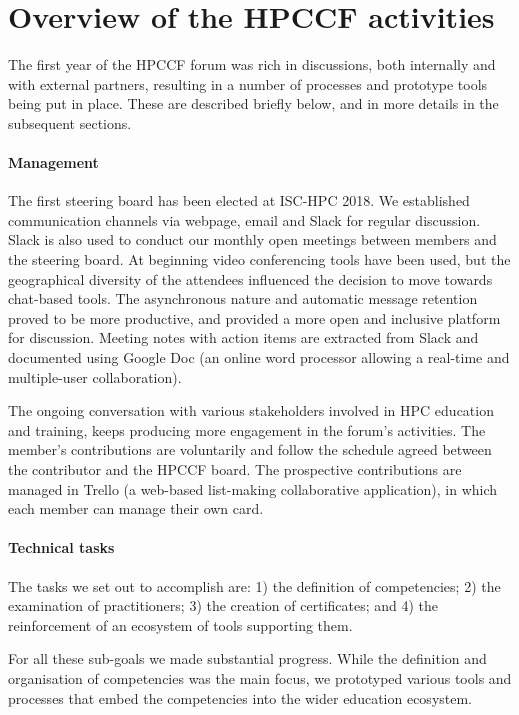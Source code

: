 \documentclass[jocse]{jocseart}
\begin{document}
\section{Overview of the HPCCF activities}
\label{sec:status}

The first year of the HPCCF forum was rich in discussions, both internally and with external partners, resulting in a number of processes and prototype tools being put in place. These are described briefly below, and in more details in the subsequent sections.

\paragraph{Management}
The first steering board has been elected at ISC-HPC 2018.
We established communication channels via webpage, email and Slack for regular discussion.
Slack is also used to conduct our monthly open meetings between members and the steering board.
At beginning video conferencing tools have been used, but the geographical diversity of the attendees influenced the decision to move towards chat-based tools.
The asynchronous nature and automatic message retention proved to be more productive, and provided a more open and inclusive platform for discussion.
Meeting notes with action items are extracted from Slack and documented using Google Doc (an online word processor allowing a real-time and multiple-user collaboration).

The ongoing conversation with various stakeholders involved in HPC education and training, keeps producing more engagement in the forum's activities.
The member's contributions are voluntarily and follow the schedule agreed between the contributor and the HPCCF board.
The prospective contributions are managed in Trello (a web-based list-making collaborative application), in which each member can manage their own card.

\paragraph{Technical tasks}
The tasks we set out to accomplish are:  1) the definition of competencies; 2) the examination of practitioners;  3) the creation of certificates; and 4) the reinforcement of an ecosystem of tools supporting them.

For all these sub-goals we made substantial progress.
While the definition and organisation of competencies was the main focus, we prototyped various tools and processes that embed the competencies into the wider education ecosystem.
\end{document}
